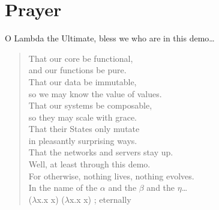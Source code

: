 \documentclass[presentation]{beamer}
\begin{document}
\section{Prayer}
\label{sec:org80416a7}
\begin{frame}[label={sec:orge09d711}]{O Lambda the Ultimate, bless we who are in this demo\ldots{}}
\begin{verse}
That our core be functional,\\
\hspace*{2em}and our functions be pure.\\
That our data be immutable,\\
\hspace*{2em}so we may know the value of values.\\
That our systems be composable,\\
\hspace*{2em}so they may scale with grace.\\
That their States only mutate\\
\hspace*{2em}in pleasantly surprising ways.\\
That the networks and servers stay up.\\
\hspace*{2em}Well, at least through this demo.\\
\vspace*{1em}
For otherwise, nothing lives, nothing evolves.\\
\vspace*{1em}
In the name of the \(\alpha\) and the \(\beta\) and the \(\eta\)\ldots{}\\
\hspace*{2em}(\(\lambda\)x.x x) (\(\lambda\)x.x x) ; eternally\\
\end{verse}
\end{frame}
\end{document}
